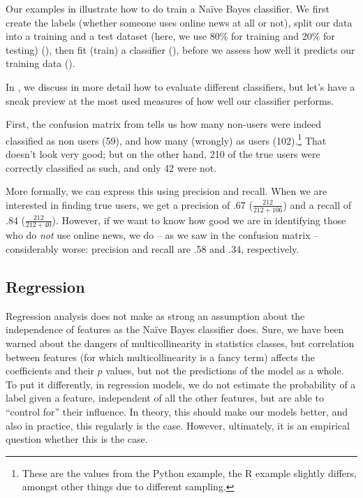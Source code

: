 Our examples in  illustrate how to do train a Na\"ive Bayes classifier.
We first create the labels (whether someone uses online news at all or
not), split our data into a training and a test dataset (here, we use
80\% for training and 20\% for testing) (), then
fit (train) a classifier (), before we assess how well it
predicts our training data ().

In , we discuss in more detail how to
evaluate different classifiers, but let's have a sneak preview at the most used 
measures of how well our classifier performs.

First, the confusion matrix from  tells us how many non-users were indeed
classified as non users (59), and how many (wrongly) as users
(102).\footnote{These are the values from the Python example, the R
  example slightly differs, amongst other things due to different
  sampling.} That doesn't look very good; but on the other hand, 210
of the true users were correctly classified as such, and only 42 were
not.

More formally, we can express this using precision and recall. When we
are interested in finding true users, we get a precision of .67
($\frac{212}{212+106}$) and a recall of .84 ($\frac{212}{212+40}$).
However, if we want to know how good we are in identifying those who
do \emph{not} use online news, we do -- as we saw in the confusion
matrix -- considerably worse: precision and recall are .58 and .34,
respectively.



\subsection{Regression}
\label{subsec:regression}

Regression analysis does not make as strong an assumption about the
independence of features as the Na\"ive Bayes classifier does.  Sure,
we have been warned about the dangers of multicollinearity in
statistics classes, but correlation between features (for which
multicollinearity is a fancy term) affects the coefficients and their
$p$ values, but not the predictions of the model as a whole.  To put
it differently, in regression models, we do not estimate the
probability of a label given a feature, independent of all the other
features, but are able to ``control for'' their influence.  In theory,
this should make our models better, and also in practice, this
regularly is the case. However, ultimately, it is an empirical
question whether this is the case.

